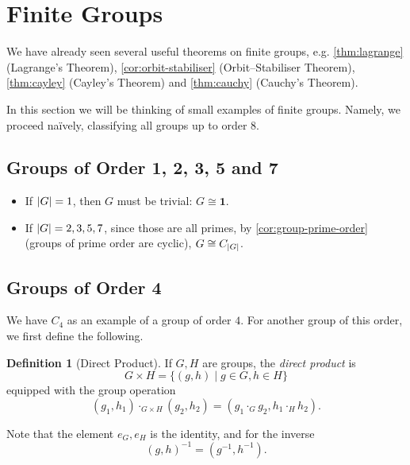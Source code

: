 \documentclass{article}
\theoremstyle{definition}
\newtheorem{definition}[theorem]{Definition}
\theoremstyle{remark}
\DeclarePairedDelimiter{\abs}{\lvert}{\rvert}
\newcommand{\pqty}[1]{\left(#1\right)}
\newcommand{\set}[2]{\{#1\mid #2\}}
\newcommand{\inverse}{^{-1}}
\newcommand{\isomorphic}{\cong}
\newcommand{\trivialgp}{\mathbf{1}}
\begin{document}
\section{Finite Groups}
\label{sec:finite-groups}

We have already seen several useful theorems on finite groups, e.g. \autoref{thm:lagrange} (Lagrange's Theorem), \autoref{cor:orbit-stabiliser} (Orbit--Stabiliser Theorem), \autoref{thm:cayley} (Cayley's Theorem) and \autoref{thm:cauchy} (Cauchy's Theorem).

In this section we will be thinking of small examples of finite groups. Namely, we proceed na\"{i}vely, classifying all groups up to order \(8\).

\subsection{Groups of Order 1, 2, 3, 5 and 7}
\label{sec:groups-of-order-1-2-3-5-7}

\begin{itemize}
    \item If \(\abs{G} = 1\), then \(G\) must be trivial: \(G \isomorphic \trivialgp\).
    \item If \(\abs{G} = 2, 3, 5, 7\), since those are all primes, by \autoref{cor:group-prime-order} (groups of prime order are cyclic), \(G \isomorphic C_{\abs{G}}\).
\end{itemize}

\subsection{Groups of Order 4}
\label{sec:groups-of-order-4}

We have \(C_4\) as an example of a group of order \(4\). For another group of this order, we first define the following.

\begin{definition}[Direct Product]
    \label{def:direct-product}%
    If \(G, H\) are groups, the \emph{direct product} is
    \[
        G \times H = \set{\pqty{g, h}}{g \in G, h \in H}
    \]
    equipped with the group operation
    \[
        \pqty{g_1, h_1} \cdot_{G \times H} \pqty{g_2, h_2} = \pqty{g_1 \cdot_G g_2, h_1 \cdot_H h_2}.
    \]

    Note that the element \(e_G, e_H\) is the identity, and for the inverse
    \[
        \pqty{g, h}\inverse = \pqty{g\inverse, h\inverse}.
    \]
\end{definition}
\end{document}
